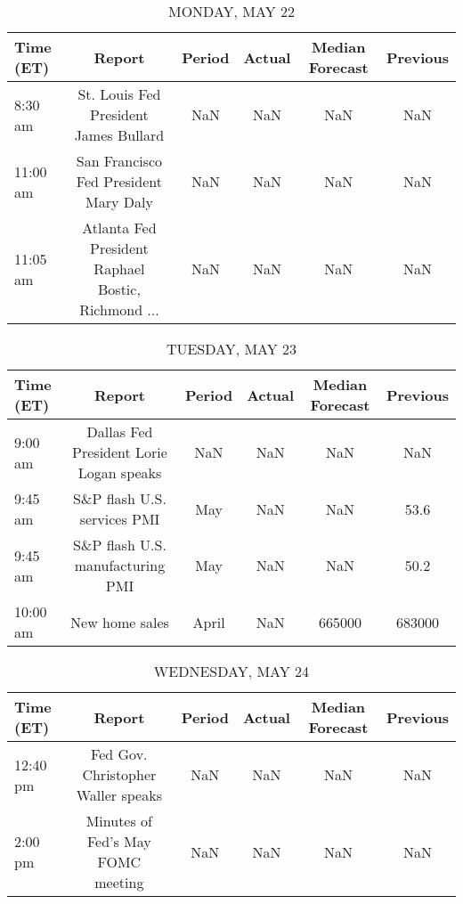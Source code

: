 \documentclass{article}%
\begin{document}
%
\normalsize%


\begin{table}[htbp]%
\caption{MONDAY, MAY 22}%
\centering%
\begin{adjustbox}{width=1\textwidth}%
\begin{tabular}{lccccc}
\toprule
Time (ET) &                                             Report & Period & Actual & Median Forecast & Previous \\
\midrule
  8:30 am &              St. Louis Fed President James Bullard &    NaN &    NaN &             NaN &      NaN \\
 11:00 am &              San Francisco Fed President Mary Daly &    NaN &    NaN &             NaN &      NaN \\
 11:05 am & Atlanta Fed President Raphael Bostic, Richmond ... &    NaN &    NaN &             NaN &      NaN \\
\bottomrule
\end{tabular}
%
\end{adjustbox}%
\end{table}

%


\begin{table}[htbp]%
\caption{TUESDAY, MAY 23}%
\centering%
\begin{adjustbox}{width=1\textwidth}%
\begin{tabular}{lccccc}
\toprule
Time (ET) &                                  Report & Period & Actual & Median Forecast & Previous \\
\midrule
  9:00 am & Dallas Fed President Lorie Logan speaks &    NaN &    NaN &             NaN &      NaN \\
  9:45 am &             S\&P flash U.S. services PMI &    May &    NaN &             NaN &     53.6 \\
  9:45 am &        S\&P flash U.S. manufacturing PMI &    May &    NaN &             NaN &     50.2 \\
 10:00 am &                          New home sales &  April &    NaN &          665000 &   683000 \\
\bottomrule
\end{tabular}
%
\end{adjustbox}%
\end{table}

%


\begin{table}[htbp]%
\caption{WEDNESDAY, MAY 24}%
\centering%
\begin{adjustbox}{width=1\textwidth}%
\begin{tabular}{lccccc}
\toprule
Time (ET) &                             Report & Period & Actual & Median Forecast & Previous \\
\midrule
 12:40 pm & Fed Gov. Christopher Waller speaks &    NaN &    NaN &             NaN &      NaN \\
  2:00 pm &  Minutes of Fed's May FOMC meeting &    NaN &    NaN &             NaN &      NaN \\
\bottomrule
\end{tabular}
%
\end{adjustbox}%
\end{table}
\end{document}
